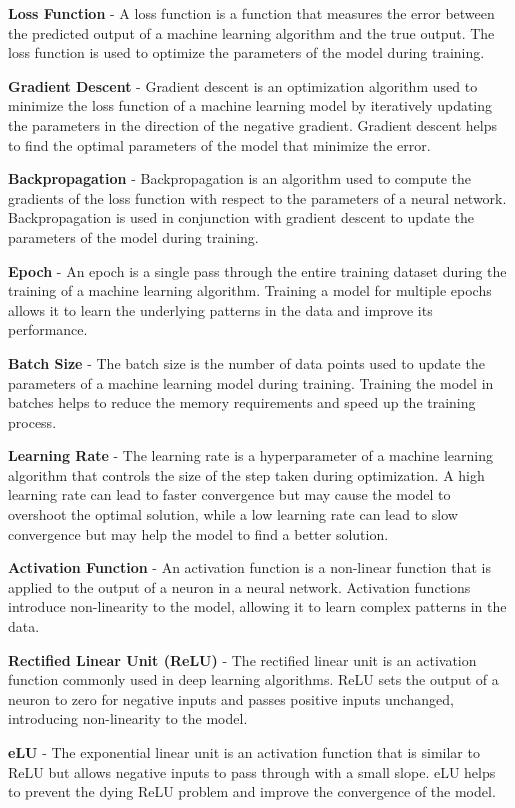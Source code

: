 \textbf{Loss Function} - A loss function is a function that measures the error between the predicted output of a machine learning algorithm and the true output. The loss function is used to optimize the parameters of the model during training.

\textbf{Gradient Descent} - Gradient descent is an optimization algorithm used to minimize the loss function of a machine learning model by iteratively updating the parameters in the direction of the negative gradient. Gradient descent helps to find the optimal parameters of the model that minimize the error.

\textbf{Backpropagation} - Backpropagation is an algorithm used to compute the gradients of the loss function with respect to the parameters of a neural network. Backpropagation is used in conjunction with gradient descent to update the parameters of the model during training.

\textbf{Epoch} - An epoch is a single pass through the entire training dataset during the training of a machine learning algorithm. Training a model for multiple epochs allows it to learn the underlying patterns in the data and improve its performance.

\textbf{Batch Size} - The batch size is the number of data points used to update the parameters of a machine learning model during training. Training the model in batches helps to reduce the memory requirements and speed up the training process.

\textbf{Learning Rate} - The learning rate is a hyperparameter of a machine learning algorithm that controls the size of the step taken during optimization. A high learning rate can lead to faster convergence but may cause the model to overshoot the optimal solution, while a low learning rate can lead to slow convergence but may help the model to find a better solution.

\textbf{Activation Function} - An activation function is a non-linear function that is applied to the output of a neuron in a neural network. Activation functions introduce non-linearity to the model, allowing it to learn complex patterns in the data.

\textbf{Rectified Linear Unit (ReLU)} - The rectified linear unit is an activation function commonly used in deep learning algorithms. ReLU sets the output of a neuron to zero for negative inputs and passes positive inputs unchanged, introducing non-linearity to the model.

\textbf{eLU} - The exponential linear unit is an activation function that is similar to ReLU but allows negative inputs to pass through with a small slope. eLU helps to prevent the dying ReLU problem and improve the convergence of the model.

